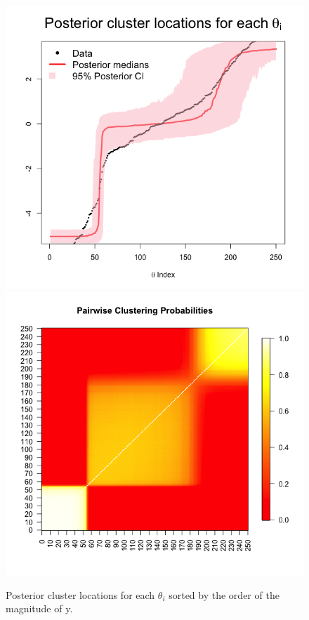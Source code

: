 \documentclass[a4paper, 10pt]{article}
\begin{document}
\begin{enumerate}
\begin{enumerate}
    \begin{figure}[h!]
        \centering
        \includegraphics[scale = 0.4]{Posterior_th_clusters.png}\includegraphics[scale = 0.4]{ClustMatrix.png}
        \caption{Posterior cluster locations for each $\theta_i$ sorted by the order of the magnitude of y.}
        \label{prob2-4}
    \end{figure}
    

\end{enumerate}
\end{enumerate}
\end{document}
